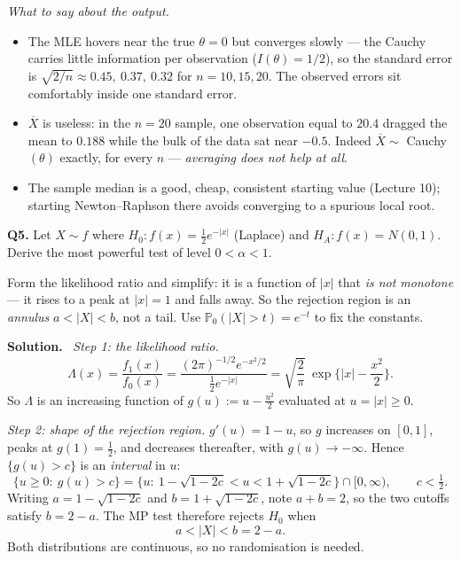 \documentclass[11pt]{article}
\newcommand{\Prob}{\mathbb{P}}
\newcommand{\Xbar}{\overline{X}}
\newenvironment{prob}[1]{\medskip\noindent\textbf{\large #1}\quad}{\par}
\newcommand{\soln}{\medskip\noindent\textbf{Solution.}\ }
\begin{document}
\emph{What to say about the output.}
\begin{itemize}
\item The MLE hovers near the true $\theta=0$ but converges slowly --- the Cauchy carries little
information per observation ($I(\theta)=1/2$), so the standard error is
$\sqrt{2/n}\approx0.45,\ 0.37,\ 0.32$ for $n=10,15,20$. The observed errors sit comfortably
inside one standard error.
\item $\Xbar$ is useless: in the $n=20$ sample, one observation equal to $20.4$ dragged the
mean to $0.188$ while the bulk of the data sat near $-0.5$. Indeed $\Xbar\sim$
Cauchy$(\theta)$ exactly, for every $n$ --- \emph{averaging does not help at all}.
\item The sample median is a good, cheap, consistent starting value (Lecture 10); starting
Newton--Raphson there avoids converging to a spurious local root.
\end{itemize}

\bigskip
\begin{prob}{Q5.}
Let $X\sim f$ where $H_0: f(x)=\tfrac12 e^{-|x|}$ (Laplace) and $H_A: f(x)=N(0,1)$. Derive the
most powerful test of level $0<\alpha<1$.
\end{prob}

\begin{ideabox}
Form the likelihood ratio and simplify: it is a function of $|x|$ that \emph{is not monotone}
--- it rises to a peak at $|x|=1$ and falls away. So the rejection region is an \emph{annulus}
$a<|X|<b$, not a tail. Use $\Prob_0(|X|>t)=e^{-t}$ to fix the constants.
\end{ideabox}

\soln
\emph{Step 1: the likelihood ratio.}
\[
\Lambda(x)=\frac{f_1(x)}{f_0(x)}=\frac{(2\pi)^{-1/2}e^{-x^2/2}}{\tfrac12 e^{-|x|}}
=\sqrt{\frac{2}{\pi}}\ \exp\Big\{|x|-\frac{x^2}{2}\Big\}.
\]
So $\Lambda$ is an increasing function of $g(u):=u-\tfrac{u^2}{2}$ evaluated at $u=|x|\ge0$.

\emph{Step 2: shape of the rejection region.} $g'(u)=1-u$, so $g$ increases on $[0,1]$, peaks
at $g(1)=\tfrac12$, and decreases thereafter, with $g(u)\to-\infty$. Hence
$\{g(u)>c\}$ is an \emph{interval} in $u$:
\[
\{u\ge0:\ g(u)>c\}=\{u:\ 1-\sqrt{1-2c}<u<1+\sqrt{1-2c}\}\cap[0,\infty),\qquad c<\tfrac12 .
\]
Writing $a=1-\sqrt{1-2c}$ and $b=1+\sqrt{1-2c}$, note $a+b=2$, so the two cutoffs satisfy
$b=2-a$. The MP test therefore rejects $H_0$ when
\[
a<|X|<b=2-a .
\]
Both distributions are continuous, so no randomisation is needed.
\end{document}
